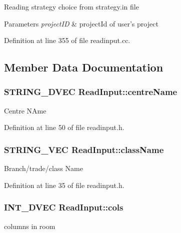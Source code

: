 Reading strategy choice from strategy.\-in file


\begin{DoxyParams}{Parameters}
{\em project\-I\-D} & project\-Id of user's project \\
\hline
\end{DoxyParams}


Definition at line 355 of file readinput.\-cc.



\subsection{Member Data Documentation}
\hypertarget{classReadInput_aedfe51d1e35384a49a870516d229c4f7}{
\subsubsection[{centre\-Name}]{\setlength{\rightskip}{0pt plus 5cm}S\-T\-R\-I\-N\-G\-\_\-D\-V\-E\-C Read\-Input\-::centre\-Name\hspace{0.3cm}{\ttfamily [protected]}}}\label{classReadInput_aedfe51d1e35384a49a870516d229c4f7}
Centre N\-Ame 

Definition at line 50 of file readinput.\-h.

\hypertarget{classReadInput_ad156aed708a64ed861988673aa21be64}{
\subsubsection[{class\-Name}]{\setlength{\rightskip}{0pt plus 5cm}S\-T\-R\-I\-N\-G\-\_\-\-V\-E\-C Read\-Input\-::class\-Name\hspace{0.3cm}{\ttfamily [protected]}}}\label{classReadInput_ad156aed708a64ed861988673aa21be64}
Branch/trade/class Name 

Definition at line 35 of file readinput.\-h.

\hypertarget{classReadInput_ac717fe1f94a77db9fb20161e00043a9d}{
\subsubsection[{cols}]{\setlength{\rightskip}{0pt plus 5cm}I\-N\-T\-\_\-D\-V\-E\-C Read\-Input\-::cols\hspace{0.3cm}{\ttfamily [protected]}}}\label{classReadInput_ac717fe1f94a77db9fb20161e00043a9d}
columns in room 

